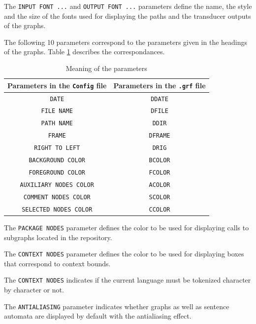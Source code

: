 \bigskip
\noindent The \verb$INPUT FONT ...$ and \verb$OUTPUT FONT ...$ parameters define the name,
the style and the size of the fonts used for displaying the paths and the
transducer outputs of the graphs.


\bigskip
\noindent The following 10 parameters correspond to the parameters given in the headings of
the graphs. Table \ref{tab-parameters} describes the
correspondances.

\begin{table}[h]
\begin{center}
\begin{tabular}{|c|c|}
\hline
Parameters in the \verb+Config+ file &  Parameters in the \verb+.grf+ file
\\
\hline
\verb$DATE$ & \verb$DDATE$
\\
\hline
\verb$FILE NAME$ & \verb$DFILE$
\\
\hline
\verb$PATH NAME$ & \verb$DDIR$
\\
\hline
\verb$FRAME$ & \verb$DFRAME$
\\
\hline
\verb$RIGHT TO LEFT$ & \verb$DRIG$
\\
\hline
\verb$BACKGROUND COLOR$ & \verb$BCOLOR$
\\
\hline
\verb$FOREGROUND COLOR$ & \verb$FCOLOR$
\\
\hline
\verb$AUXILIARY NODES COLOR$ & \verb$ACOLOR$
\\
\hline
\verb$COMMENT NODES COLOR$ & \verb$SCOLOR$
\\
\hline
\verb$SELECTED NODES COLOR$ & \verb$CCOLOR$
\\
\hline
\end{tabular}
\caption{Meaning of the parameters\label{tab-parameters}}
\end{center}
\end{table}

\bigskip
\noindent The \verb+PACKAGE NODES+ parameter defines the color to be used for
displaying calls to subgraphs located in the repository.

\bigskip
\noindent The \verb+CONTEXT NODES+ parameter defines the color to be used for
displaying boxes that correspond to context bounds.

\bigskip
\noindent The \verb+CONTEXT NODES+ indicates if the current language must be
tokenized character by character or not.

\bigskip
\noindent The \verb+ANTIALIASING+ parameter indicates whether graphs as well as
sentence automata are displayed by default with the antialiasing effect.


